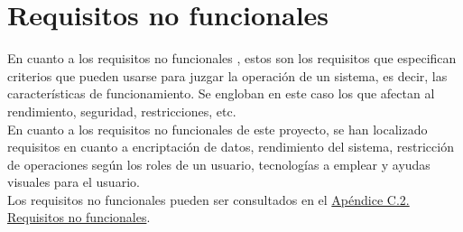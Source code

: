 \section{Requisitos no funcionales}

En cuanto a los requisitos no funcionales \cite{requisitos}, estos son los requisitos que especifican criterios que pueden usarse para juzgar la operación de un sistema, es decir, las características de funcionamiento. Se engloban en este caso los que afectan al rendimiento, seguridad, restricciones, etc. 
\\

En cuanto a los requisitos no funcionales de este proyecto, se han localizado requisitos en cuanto a encriptación de datos, rendimiento del sistema, restricción de operaciones según los roles de un usuario, tecnologías a emplear y ayudas visuales para el usuario.
\\

Los requisitos no funcionales pueden ser consultados en el \hyperref[APRequisitosNoFuncionales]{Apéndice C.2. Requisitos no funcionales}.